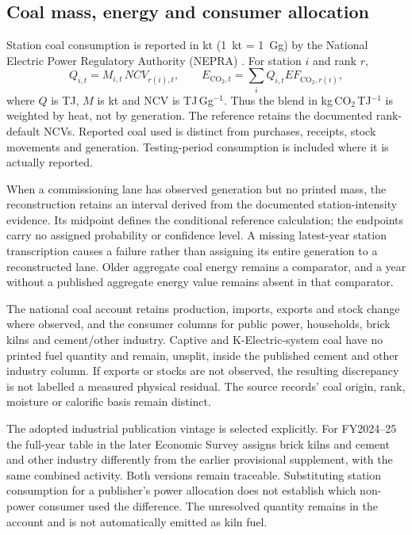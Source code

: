 \documentclass[essd]{copernicus}
\begin{document}
\subsection{Coal mass, energy and consumer allocation}
Station coal consumption is reported in kt (1~kt = 1~Gg) by the National Electric Power Regulatory Authority (NEPRA) \citep{NEPRA2024}. For station $i$ and rank $r$,
\begin{equation}
 Q_{i,t}=M_{i,t}\,NCV_{r(i),t},\qquad
 E_{\mathrm{CO_2},t}=\sum_i Q_{i,t}EF_{\mathrm{CO_2},r(i)},
 \label{eq:station_coal}
\end{equation}
where $Q$ is TJ, $M$ is kt and NCV is TJ\,Gg$^{-1}$. Thus the blend in kg\,CO$_2$\,TJ$^{-1}$ is weighted by heat, not by generation. The reference retains the documented rank-default NCVs. Reported coal used is distinct from purchases, receipts, stock movements and generation. Testing-period consumption is included where it is actually reported.

When a commissioning lane has observed generation but no printed mass, the reconstruction retains an interval derived from the documented station-intensity evidence. Its midpoint defines the conditional reference calculation; the endpoints carry no assigned probability or confidence level. A missing latest-year station transcription causes a failure rather than assigning its entire generation to a reconstructed lane. Older aggregate coal energy remains a comparator, and a year without a published aggregate energy value remains absent in that comparator.

The national coal account retains production, imports, exports and stock change where observed, and the consumer columns for public power, households, brick kilns and cement/other industry. Captive and K-Electric-system coal have no printed fuel quantity and remain, unsplit, inside the published cement and other industry column. If exports or stocks are not observed, the resulting discrepancy is not labelled a measured physical residual. The source records' coal origin, rank, moisture or calorific basis remain distinct.

The adopted industrial publication vintage is selected explicitly. For FY2024--25 the full-year table in the later Economic Survey assigns brick kilns and cement and other industry differently from the earlier provisional supplement, with the same combined activity. Both versions remain traceable. Substituting station consumption for a publisher's power allocation does not establish which non-power consumer used the difference. The unresolved quantity remains in the account and is not automatically emitted as kiln fuel.
\end{document}
